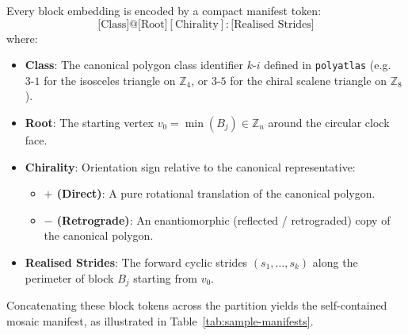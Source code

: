 Every block embedding is encoded by a compact manifest token:
\begin{equation}
\label{eqn:block-manifest-syntax}
\text{[Class]}@\text{[Root]}[\text{Chirality}]:\text{[Realised Strides]}
\end{equation}
where:
\begin{itemize}
    \item \textbf{Class}: The canonical polygon class identifier $k\text{-}i$ defined in \texttt{polyatlas} (e.g.\ $3\text{-}1$ for the isosceles triangle on $\mathbb{Z}_4$, or $3\text{-}5$ for the chiral scalene triangle on $\mathbb{Z}_8$).
    \item \textbf{Root}: The starting vertex $v_0 = \min(B_j) \in \mathbb{Z}_n$ around the circular clock face.
    \item \textbf{Chirality}: Orientation sign relative to the canonical representative:
    \begin{itemize}
        \item \textbf{$+$ (Direct)}: A pure rotational translation of the canonical polygon.
        \item \textbf{$-$ (Retrograde)}: An enantiomorphic (reflected / retrograded) copy of the canonical polygon.
    \end{itemize}
    \item \textbf{Realised Strides}: The forward cyclic strides $(s_1, \dots, s_k)$ along the perimeter of block $B_j$ starting from $v_0$.
\end{itemize}

Concatenating these block tokens across the partition yields the self-contained mosaic manifest, as illustrated in Table~\ref{tab:sample-manifests}.

